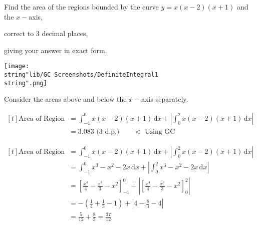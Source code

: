 \documentclass[11pt,a4paper]{book}
\begin{document}
\begin{example}

Find the area of the regions bounded by the curve $y=x\left(x-2\right)\left(x+1\right)$ and the $x-$axis,

\begin{tasks}[label=(\alph*),label-width=3.5ex,after-item-skip=2mm]

\task  correct to $3$ decimal places,

\task  giving your answer in exact form.

\end{tasks}

\Solution

\begin{center}
\texttt{[image: \\string"lib/GC Screenshots/DefiniteIntegral1\\string".png]}
\par\end{center}

\begin{tasks}[label=(\alph*),label-width=3.5ex,after-item-skip=1cm]

\task  Consider the areas above and below the $x-$axis separately.

$
\begin{aligned}[t]
\text{Area of Region} & =\int_{-1}^{0}x\left(x-2\right)\left(x+1\right)\,\mathrm{d}x+\left|\int_{0}^{2}x\left(x-2\right)\left(x+1\right)\,\mathrm{d}x\right|\\
 & =3.083\text{ (3 d.p.)}\qquad\triangleleft\text{ Using GC}
\end{aligned}
$

\task 
$
\begin{aligned}[t]
\text{Area of Region} & =\int_{-1}^{0}x\left(x-2\right)\left(x+1\right)\,\mathrm{d}x+\left|\int_{0}^{2}x\left(x-2\right)\left(x+1\right)\,\mathrm{d}x\right|\\
 & =\int_{-1}^{0}x^{3}-x^{2}-2x\,\mathrm{d}x+\left|\int_{0}^{2}x^{3}-x^{2}-2x\,\mathrm{d}x\right|\\
 & =\left[\frac{x^{4}}{4}-\frac{x^{3}}{3}-x^{2}\right]_{-1}^{0}+\left|\left[\frac{x^{4}}{4}-\frac{x^{3}}{3}-x^{2}\right]_{0}^{2}\right|\\
 & =-\left(\frac{1}{4}+\frac{1}{3}-1\right)+\left|4-\frac{8}{3}-4\right|\\
 & =\frac{5}{12}+\frac{8}{3}=\frac{37}{12}
\end{aligned}
$
\end{tasks}

\end{example}
\end{document}
